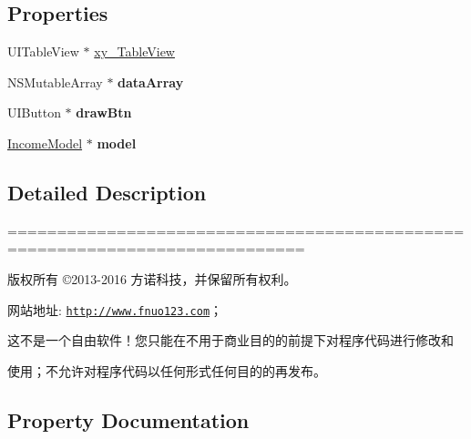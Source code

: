 \subsection*{Properties}
\begin{DoxyCompactItemize}
\item 
U\+I\+Table\+View $\ast$ \mbox{\hyperlink{category_income_view_controller_07_08_a23cdc036632160478ae142f76e313313}{xy\+\_\+\+Table\+View}}
\item 
\mbox{\label{category_income_view_controller_07_08_a0022b5d588fc915d2e771c6b2483a7dd}} 
N\+S\+Mutable\+Array $\ast$ {\bfseries data\+Array}
\item 
\mbox{\label{category_income_view_controller_07_08_a4aafa31d77f5f24227c32d25646ed2be}} 
U\+I\+Button $\ast$ {\bfseries draw\+Btn}
\item 
\mbox{\label{category_income_view_controller_07_08_a838b75f7072becdebc255498e7366208}} 
\mbox{\hyperlink{interface_income_model}{Income\+Model}} $\ast$ {\bfseries model}
\end{DoxyCompactItemize}


\subsection{Detailed Description}
============================================================================

版权所有 ©2013-\/2016 方诺科技，并保留所有权利。

网站地址\+: \href{http://www.fnuo123.com}{\tt http\+://www.\+fnuo123.\+com}； 



这不是一个自由软件！您只能在不用于商业目的的前提下对程序代码进行修改和

使用；不允许对程序代码以任何形式任何目的的再发布。 

 

\subsection{Property Documentation}
\mbox{\label{category_income_view_controller_07_08_a23cdc036632160478ae142f76e313313}} 
